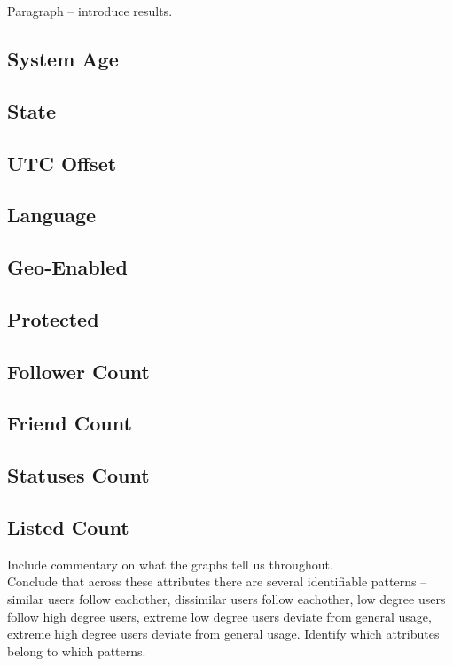 Paragraph -- introduce results. \\

\subsection{System Age}
\subsection{State}
\subsection{UTC Offset}
\subsection{Language}
\subsection{Geo-Enabled}
\subsection{Protected}
\subsection{Follower Count}
\subsection{Friend Count}
\subsection{Statuses Count}
\subsection{Listed Count}

Include commentary on what the graphs tell us throughout.\\

Conclude that across these attributes there are several identifiable patterns -- similar users follow eachother, dissimilar users follow eachother, low degree users follow high degree users, extreme low degree users deviate from general usage, extreme high degree users deviate from general usage.  Identify which attributes belong to which patterns.\\